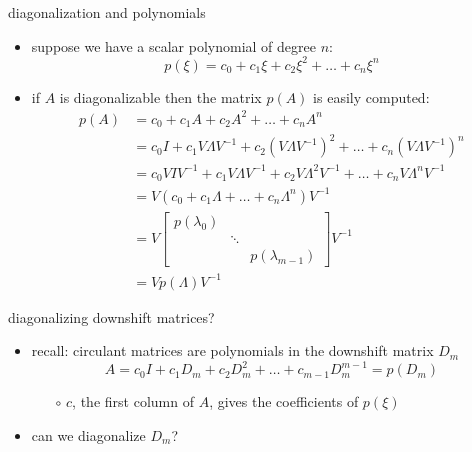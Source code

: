 \documentclass[10pt,
               svgnames,
               hyperref={colorlinks,citecolor=DeepPink4,linkcolor=FireBrick,urlcolor=Maroon},
               usepdftitle=false]{beamer}
\begin{document}
\begin{frame}{diagonalization and polynomials}

\begin{itemize}
\item suppose we have a scalar polynomial of degree $n$:
	$$p(\xi) = c_0 + c_1 \xi + c_2 \xi^2 + \dots + c_n \xi^n$$
\item if $A$ is diagonalizable then the matrix $p(A)$ is easily computed:
\begin{align*}
p(A) &= c_0 + c_1 A + c_2 A^2 + \dots + c_n A^n \\
     &= c_0 I + c_1 V \Lambda V^{-1} + c_2 \left(V \Lambda V^{-1}\right)^2 + \dots + c_n \left(V \Lambda V^{-1}\right)^n \\
     &= c_0 V I V^{-1} + c_1 V \Lambda V^{-1} + c_2 V \Lambda^2 V^{-1} + \dots + c_n V \Lambda^n V^{-1} \\
     &= V \left(c_0 + c_1 \Lambda + \dots + c_n \Lambda^n\right) V^{-1} \\
     &= V \begin{bmatrix} p(\lambda_0) & & \\ & \ddots & \\ & & p(\lambda_{m-1}) \end{bmatrix} V^{-1} \\
     &= V p(\Lambda) V^{-1}
\end{align*}
\end{itemize}
\end{frame}


\begin{frame}{diagonalizing downshift matrices?}

\begin{itemize}
\item recall: circulant matrices are polynomials in the downshift matrix $D_m$
	$$A = c_0 I + c_1 D_m + c_2 D_m^2 + \dots + c_{m-1} D_m^{m-1} = p(D_m)$$

   \begin{itemize}
   \item[$\circ$] $c$, the first column of $A$, gives the coefficients of $p(\xi)$
   \end{itemize}  
\item can we diagonalize $D_m$?
\end{itemize}
\end{frame}
\end{document}
